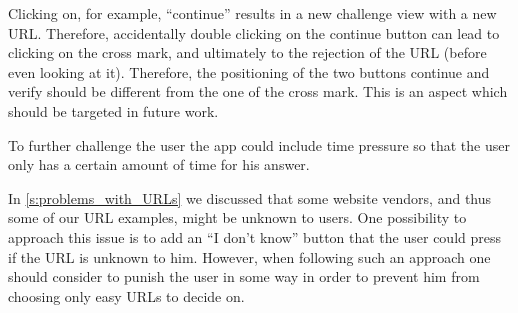 \begin{description}[leftmargin=0cm]
Clicking on, for example, ``continue'' results in a new challenge view with a new URL.
Therefore, accidentally double clicking on the continue button can lead to clicking on the cross mark, and ultimately to the rejection of the URL (before even looking at it).
Therefore, the positioning of the two buttons continue and verify should be different from the one of the cross mark.
This is an aspect which should be targeted in future work. 
\item[Time Pressure:] To further challenge the user the app could include time pressure so that the user only has a certain amount of time for his answer.
\item[Unkown Services:] In \ref{s:problems_with_URLs} we discussed that some website vendors, and thus some of our URL examples, might be unknown to users. One possibility to approach this issue is to add an ``I don't know'' button that the user could press if the URL is unknown to him. However, when following such an approach one should consider to punish the user in some way in order to prevent him from choosing only easy URLs to decide on.
\end{description}



